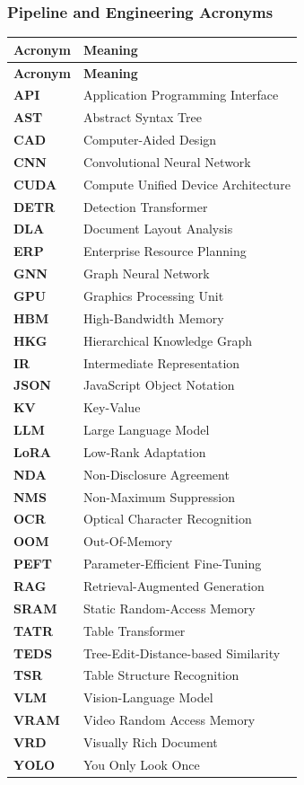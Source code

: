 \subsubsection{Pipeline and Engineering Acronyms}
\begin{longtable}{lp{}}
		\toprule
		\textbf{Acronym} & \textbf{Meaning} \\ \midrule
\endfirsthead
		\toprule
		\textbf{Acronym} & \textbf{Meaning} \\ \midrule
\endhead
		\bottomrule
\endfoot
		\textbf{API} & Application Programming Interface \\
		\textbf{AST} & Abstract Syntax Tree \\
		\textbf{CAD} & Computer-Aided Design \\
		\textbf{CNN} & Convolutional Neural Network \\
		\textbf{CUDA} & Compute Unified Device Architecture \\
		\textbf{DETR} & Detection Transformer \\
		\textbf{DLA} & Document Layout Analysis \\
		\textbf{ERP} & Enterprise Resource Planning \\
		\textbf{GNN} & Graph Neural Network \\
		\textbf{GPU} & Graphics Processing Unit \\
		\textbf{HBM} & High-Bandwidth Memory \\
		\textbf{HKG} & Hierarchical Knowledge Graph \\
		\textbf{IR} & Intermediate Representation \\
		\textbf{JSON} & JavaScript Object Notation \\
		\textbf{KV} & Key-Value \\
		\textbf{LLM} & Large Language Model \\
		\textbf{LoRA} & Low-Rank Adaptation \\
		\textbf{NDA} & Non-Disclosure Agreement \\
		\textbf{NMS} & Non-Maximum Suppression \\
		\textbf{OCR} & Optical Character Recognition \\
		\textbf{OOM} & Out-Of-Memory \\
		\textbf{PEFT} & Parameter-Efficient Fine-Tuning \\
		\textbf{RAG} & Retrieval-Augmented Generation \\
		\textbf{SRAM} & Static Random-Access Memory \\
		\textbf{TATR} & Table Transformer \\
		\textbf{TEDS} & Tree-Edit-Distance-based Similarity \\
		\textbf{TSR} & Table Structure Recognition \\
		\textbf{VLM} & Vision-Language Model \\
		\textbf{VRAM} & Video Random Access Memory \\
		\textbf{VRD} & Visually Rich Document \\
		\textbf{YOLO} & You Only Look Once \\
\end{longtable}


